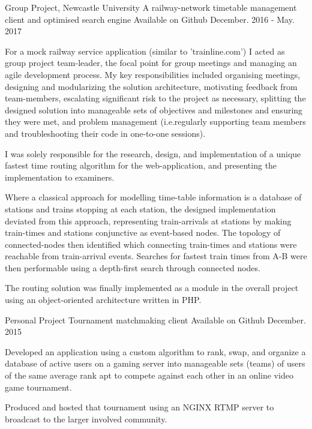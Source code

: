 \begin{cventries}
  \cventry
    {Group Project, Newcastle University} %
    {A railway-network timetable management client and optimised search engine} %
    {Available on Github} %
    {December. 2016 - May. 2017} %
    {
      \begin{cvitems} %
  \item {For a mock railway service application (similar to 'trainline.com') I acted as group project team-leader, the focal point for group meetings and managing an agile development process. My key responsibilities included organising meetings, designing and modularizing the solution architecture, motivating feedback from team-members, escalating significant risk to the project as necessary, splitting the designed solution into manageable sets of objectives and milestones and ensuring they were met, and problem management (i.e.regularly supporting team members and troubleshooting their code in one-to-one sessions).}
  \item {I was solely responsible for the research, design, and implementation of a unique fastest time routing algorithm for the web-application, and presenting the implementation to examiners.}
  \item {Where a classical approach for modelling time-table information is a database of stations and trains stopping at each station, the designed implementation deviated from this approach, representing train-arrivals at stations by making train-times and stations conjunctive as event-based nodes. The topology of connected-nodes then identified which connecting train-times and stations were reachable from train-arrival events. Searches for fastest train times from A-B were then performable using a depth-first search through connected nodes.}
  \item {The routing solution was finally implemented as a module in the overall project using an object-oriented architecture written in PHP.}
      \end{cvitems}
    }

  \cventry
    {Personal Project} %
    {Tournament matchmaking client} %
    {Available on Github} %
    {December. 2015} %
    {
      \begin{cvitems} %
  \item {Developed an application using a custom algorithm to rank, swap, and organize a database of active users on a gaming server into manageable sets (teams) of users of the same average rank apt to compete against each other in an online video game tournament.}
  \item {Produced and hosted that tournament using an NGINX RTMP server to broadcast to the larger involved community.}
      \end{cvitems}
    }


\end{cventries}

